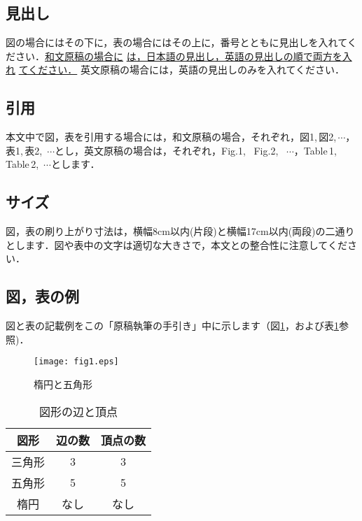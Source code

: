\documentclass{hisken}
\begin{document}
\subsection{見出し}
図の場合にはその下に，表の場合にはその上に，番号とともに見出しを入れてください．{\underline{和文原稿の場合に} \underline{は，日本語の見出し，英語の見出しの順で両方を入れ} \underline{てください．}} 英文原稿の場合には，英語の見出しのみを入れてください．

\subsection{引用}
本文中で図，表を引用する場合には，和文原稿の場合，それぞれ，図1,\,図2,\,$ \cdots $，表1,\,表2,\, $ \cdots $とし，英文原稿の場合は，それぞれ，Fig.1, \, Fig.2, \, $ \cdots $，Table\,1,\,Table\,2,\, $ \cdots $とします．

\subsection{サイズ}
図，表の刷り上がり寸法は，横幅8cm以内(片段)と横幅17cm以内(両段)の二通りとします．図や表中の文字は適切な大きさで，本文との整合性に注意してください．

\subsection{図，表の例}
図と表の記載例をこの「原稿執筆の手引き」中に示します（図\ref{fig:example1}，および表\ref{table:example2}参照)．

\begin{figure}[tb]
	\begin{center}
    \texttt{[image: fig1.eps]}
	\caption{楕円と五角形}		%
	\label{fig:example1}
	\end{center}
\end{figure}

\begin{table}[t]
	\begin{center}
	\caption{図形の辺と頂点}		%
	\label{table:example2}
	\begin{tabular}[hbt]{c c c}
	\hline
	\bf 図形 & \bf 辺の数 & \bf 頂点の数\\
	\hline
	三角形 & 3 & 3\\
	五角形 & 5 & 5\\
	楕円 & なし & なし\\
	\hline
	\end{tabular}
	\end{center}
\end{table}
\end{document}
